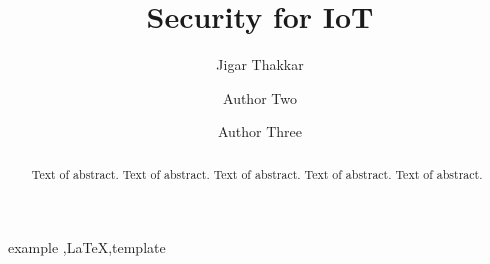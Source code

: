 \documentclass[preprint,12pt,5p]{elsarticle}
\begin{document}
\begin{frontmatter}

\title{Security for IoT}


 
\author[label1]{Jigar Thakkar}
\address[label1]{Master of IT,The University of Melbourne, Vic - 3010, Australia, thakkarj@student.unimelb.edu.au}
\address[label2]{Address Two}



\author[label5]{Author Two}
\address[label5]{Some University}

\author[label1,label5]{Author Three}

\begin{abstract}
Text of abstract. Text of abstract. Text of abstract. Text of abstract. Text of abstract. 
\end{abstract}

\begin{keyword}
example \sep \LaTeX \sep template
\end{keyword}

\end{frontmatter}


\end{document}
